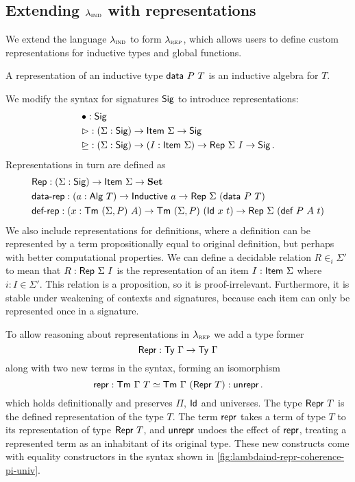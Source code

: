 \subsection{Extending $\lambda_{\textsc{ind}}$ with representations}

We extend the language $\lambda_{\textsc{ind}}$ to form $\lambda_{\textsc{rep}}$, which allows users to
define custom representations for inductive types and global functions.

\begin{definition}
	A representation of an inductive type $\textsf{data}\ P\ T$ is an inductive algebra for $T$.
\end{definition}

We modify the syntax for signatures $\textsf{Sig}$ to introduce representations:
\begin{align*}
	 & \bullet : \Sig \\
	 & \rhd : (\Sigma : \Sig) \to \Item\ \Sigma \to \Sig \\
	 & \unrhd : (\Sigma : \Sig) \to (I : \Item\ \Sigma) \to \Rep\ \Sigma\ I \to \Sig \,.
\end{align*}
Representations in turn are defined as
\begin{align*}
& \Rep : (\Sigma : \Sig) \to \Item\ \Sigma \to \Set \\
& \mta{data-rep} : (a : \mta{Alg}\ T) \to \mta{Inductive}\ a \to \Rep\ \Sigma\ (\mta{data}\ P\ T) \\
& \mta{def-rep} : (x : \Tm\ (\Sigma, P)\ A) \to \Tm\ (\Sigma, P)\ (\mta{Id}\ x\ t) \to \Rep\ \Sigma\ (\mta{def}\ P\ A\ t)
\end{align*}
We also include representations for definitions, where a definition can be
represented by a term propositionally equal to original definition, but perhaps
with better computational properties.
We can define a decidable relation $R \in_i \Sigma'$ to mean that $R :
\textsf{Rep}\ \Sigma\ I$ is the representation of an item $I : \textsf{Item}\ \Sigma$
where $i : I \in \Sigma'$.
This relation is a proposition, so it is proof-irrelevant. Furthermore, it is stable under
weakening of contexts and signatures, because each item can only be represented once in a signature.

To allow reasoning about representations in $\lambda_{\textsc{rep}}$ we add a type former
\begin{equation}\label{eq:repr-ty}
	\textsf{Repr}{} : \textsf{Ty}\ \Gamma \to \textsf{Ty}\ \Gamma
\end{equation}
along with two new terms in the syntax, forming an isomorphism
\begin{equation}\label{eq:repr-iso}
	\textsf{repr}{} : \textsf{Tm}\ \Gamma\ T \simeq \textsf{Tm}\ \Gamma\ (\textsf{Repr}\ T) : \textsf{unrepr}{} \,.
\end{equation}
which holds definitionally and preserves $\Pi$, $\textsf{Id}$ and universes. The
type $\MRepr\ T$ is the defined representation of the type $T$. The term
$\textsf{repr}{}$ takes a term of type $T$ to its representation of type $\MRepr\ T$,
and $\textsf{unrepr}{}$ undoes the
effect of $\textsf{repr}{}$, treating a represented term as an inhabitant of its
original type. These new constructs come with equality constructors in the syntax
shown in \cref{fig:lambdaind-repr-coherence-pi-univ}.

